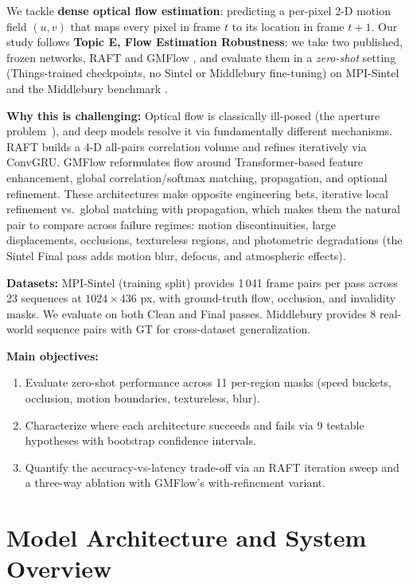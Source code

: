 \documentclass[11pt,a4paper]{article}
\let\origsection\section
\renewcommand{\section}{\FloatBarrier\origsection}
\begin{document}
We tackle \textbf{dense optical flow estimation}: predicting a per-pixel
2-D motion field $(u,v)$ that maps every pixel in frame $t$ to its location
in frame $t{+}1$.  Our study follows \textbf{Topic E, Flow Estimation
Robustness}: we take two published, frozen networks, RAFT
\cite{teed2020raft} and GMFlow \cite{xu2022gmflow}, and evaluate them
in a \emph{zero-shot} setting (Things-trained checkpoints, no Sintel or
Middlebury fine-tuning) on MPI-Sintel \cite{butler2012sintel} and the
Middlebury benchmark \cite{baker2011}.

\textbf{Why this is challenging:}
Optical flow is classically ill-posed (the aperture problem~\cite{horn1981}), and deep
models resolve it via fundamentally different mechanisms. RAFT builds
a 4-D all-pairs correlation volume and refines iteratively via ConvGRU.
GMFlow reformulates flow around Transformer-based feature enhancement,
global correlation/softmax matching, propagation, and optional refinement.
These architectures make opposite engineering bets, iterative local
refinement vs.\ global matching with propagation, which makes them the
natural pair to compare across
failure regimes: motion discontinuities, large displacements,
occlusions, textureless regions, and photometric degradations (the
Sintel Final pass adds motion blur, defocus, and atmospheric effects).

\textbf{Datasets:}
MPI-Sintel (training split) provides 1\,041 frame pairs per pass across
23 sequences at $1024{\times}436$ px, with ground-truth flow,
occlusion, and invalidity masks.  We evaluate on both Clean and Final
passes.  Middlebury provides 8 real-world sequence pairs with GT for
cross-dataset generalization.

\textbf{Main objectives:}
\begin{enumerate}[leftmargin=1.4em,topsep=2pt,itemsep=1pt]
  \item Evaluate zero-shot performance across 11 per-region masks
        (speed buckets, occlusion, motion boundaries, textureless,
        blur).
  \item Characterize where each architecture succeeds and fails via
        9 testable hypotheses with bootstrap confidence intervals.
  \item Quantify the accuracy-vs-latency trade-off via an RAFT
        iteration sweep and a three-way ablation with GMFlow's
        with-refinement variant.
\end{enumerate}

\section{Model Architecture and System Overview}
\end{document}
